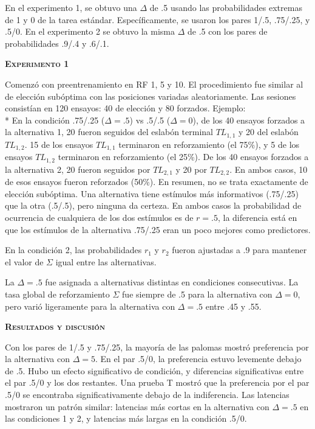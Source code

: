 \documentclass[a4paper,12pt]{article}
\begin{document}
En el experimento 1, se obtuvo una $\Delta$ de .5 usando las probabilidades extremas de 1 y 0 de la tarea estándar. Específicamente, se usaron los pares 1/.5, .75/.25, y .5/0. En el experimento 2 se obtuvo la misma $\Delta$ de .5 con los pares de probabilidades .9/.4 y .6/.1.

{\scshape \bfseries Experimento 1}

Comenzó con preentrenamiento en RF 1, 5 y 10. El procedimiento fue similar al de elección subóptima con las posiciones variadas aleatoriamente. Las sesiones consistían en 120 ensayos: 40 de elección y 80 forzados. Ejemplo: \\*
En la condición .75/.25 ($\Delta={.}5$) vs .5/.5 ($\Delta=0$), de los 40 ensayos forzados a la alternativa 1, 20 fueron seguidos del eslabón terminal $TL_{1,1}$ y 20 del eslabón $TL_{1,2}$. 15 de los ensayos $TL_{1,1}$ terminaron en reforzamiento (el 75\%), y 5 de los ensayos $TL_{1,2}$ terminaron en reforzamiento (el 25\%). De los 40 ensayos forzados a la alternativa 2, 20 fueron seguidos por $TL_{2,1}$ y 20 por $TL_{2,2}$. En ambos casos, 10 de esos ensayos fueron reforzados (50\%). En resumen, no se trata exactamente de elección subóptima. Una alternativa tiene estímulos más informativos (.75/.25) que la otra (.5/.5), pero ninguna da certeza. En ambos casos la probabilidad de ocurrencia de cualquiera de los dos estímulos es de $r={.}5$, la diferencia está en que los estímulos de la alternativa .75/.25 eran un poco mejores como predictores. 

En la condición 2, las probabilidades $r_1$ y $r_2$ fueron ajustadas a .9 para mantener el valor de $\Sigma$ igual entre las alternativas.

La $\Delta={.}5$ fue asignada a alternativas distintas en condiciones consecutivas. La tasa global de reforzamiento $\Sigma$ fue siempre de .5 para la alternativa con $\Delta=0$, pero varió ligeramente para la alternativa con $\Delta={.}5$ entre .45 y .55. 

{\scshape\bfseries Resultados y discusión}

Con los pares de 1/.5 y .75/.25, la mayoría de las palomas mostró preferencia por la alternativa con $\Delta=5$. En el par .5/0, la preferencia estuvo levemente debajo de .5. Hubo un efecto significativo de condición, y diferencias significativas entre el par .5/0 y los dos restantes. Una prueba T mostró que la preferencia por el par .5/0 se encontraba significativamente debajo de la indiferencia. Las latencias mostraron un patrón similar: latencias más cortas en la alternativa con $\Delta={.}5$ en las condiciones 1 y 2, y latencias más largas en la condición .5/0. 
\end{document}
